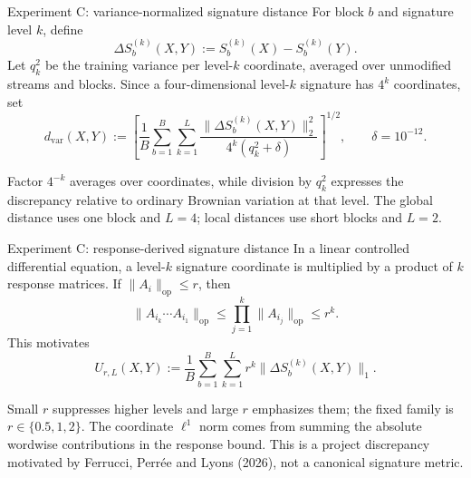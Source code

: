 \documentclass[aspectratio=169,9pt]{beamer}
\begin{document}
\begin{frame}{Experiment C: variance-normalized signature distance}
  For block $b$ and signature level $k$, define
  \[
    \Delta S_b^{(k)}(X,Y):=S_b^{(k)}(X)-S_b^{(k)}(Y).
  \]
  Let $q_k^2$ be the training variance per level-$k$ coordinate, averaged over unmodified streams and blocks. Since a four-dimensional level-$k$ signature has $4^k$ coordinates, set
  \[
    d_{\mathrm{var}}(X,Y)
    :=\left[
      \frac1B\sum_{b=1}^{B}\sum_{k=1}^{L}
      \frac{\|\Delta S_b^{(k)}(X,Y)\|_2^2}
           {4^k(q_k^2+\delta)}
    \right]^{1/2},
    \qquad \delta=10^{-12}.
  \]

  Factor $4^{-k}$ averages over coordinates, while division by $q_k^2$ expresses the discrepancy relative to ordinary Brownian variation at that level. The global distance uses one block and $L=4$; local distances use short blocks and $L=2$.
\end{frame}

\begin{frame}{Experiment C: response-derived signature distance}
  In a linear controlled differential equation, a level-$k$ signature coordinate is multiplied by a product of $k$ response matrices. If $\|A_i\|_{\mathrm{op}}\le r$, then
  \[
    \|A_{i_k}\cdots A_{i_1}\|_{\mathrm{op}}
    \le \prod_{j=1}^{k}\|A_{i_j}\|_{\mathrm{op}}
    \le r^k.
  \]
  This motivates
  \[
    U_{r,L}(X,Y)
    :=\frac1B\sum_{b=1}^{B}\sum_{k=1}^{L}
      r^k\|\Delta S_b^{(k)}(X,Y)\|_1.
  \]

  Small $r$ suppresses higher levels and large $r$ emphasizes them; the fixed family is $r\in\{0.5,1,2\}$. The coordinate $\ell^1$ norm comes from summing the absolute wordwise contributions in the response bound. This is a project discrepancy motivated by Ferrucci, Perr\'ee and Lyons (2026), not a canonical signature metric.
\end{frame}
\end{document}
